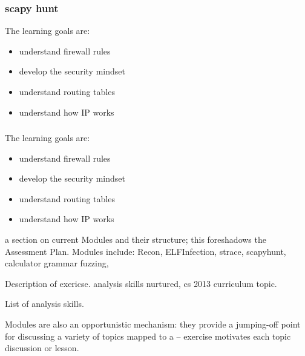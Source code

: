 \subsubsection{scapy hunt}
The learning goals are:
\begin{itemize}
\item understand firewall rules
\item develop the security mindset
\item understand routing tables
\item understand how IP works
\end{itemize}

\subsubsection{}
The learning goals are:
\begin{itemize}
\item understand firewall rules
\item develop the security mindset
\item understand routing tables
\item understand how IP works
\end{itemize}

   a section on current Modules and their structure; this
   foreshadows the Assessment Plan. Modules include: Recon,
   ELFInfection, strace, scapyhunt, calculator grammar fuzzing,

   Description of exericse. analysis skills nurtured, cs 2013 curriculum topic.
   
   List of analysis skills.

   Modules are also an opportunistic mechanism: they provide a
   jumping-off point for discussing a variety of topics mapped to
   a -- exercise motivates each topic discussion or lesson.
